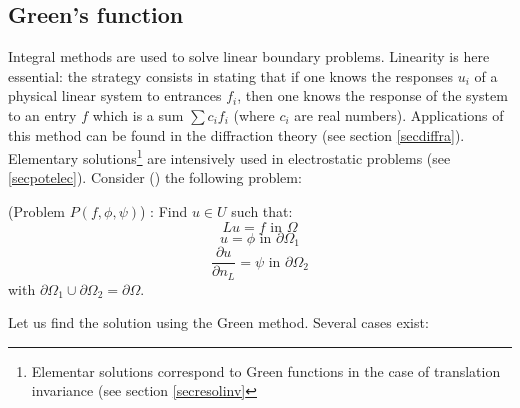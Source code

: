 \documentclass[12pt]{book}
\begin{document}
\subsection{Green's function}
Integral methods are used to solve linear boundary problems. Linearity is here
essential: the strategy consists in stating that if one knows the responses
$u_i$ of a physical linear system to entrances $f_i$, then one knows the
response of the system to an entry $f$ which is a sum $\sum c_i f_i$ (where
$c_i$ are real numbers).
Applications of this method can be found in the diffraction theory (see
section \ref{secdiffra}). Elementary solutions\footnote{Elementar
solutions correspond to Green functions in the case of translation
invariance (see section \ref{secresolinv}}  are intensively used in
electrostatic problems (see \ref{secpotelec}).
Consider (\cite{ph:elect:VanBladel75,ma:equad:Dautray1})
the following problem:
\begin{prob}\label{probpfppgreen} (Problem $P(f,\phi,\psi)$) :
Find $u\in U$ such that:
\begin{equation}
 Lu=f \mbox{ in } \Omega
\end{equation}
\begin{equation}
u=\phi \mbox{ in } \partial \Omega_1
\end{equation}
\begin{equation}
\frac{\partial u}{\partial n_{L}}=\psi \mbox{ in } \partial \Omega_2
\end{equation}
with $\partial \Omega_1 \cup\partial \Omega_2=\partial \Omega$.
\end{prob}
Let us find the solution using the Green method. Several cases exist:
\end{document}
